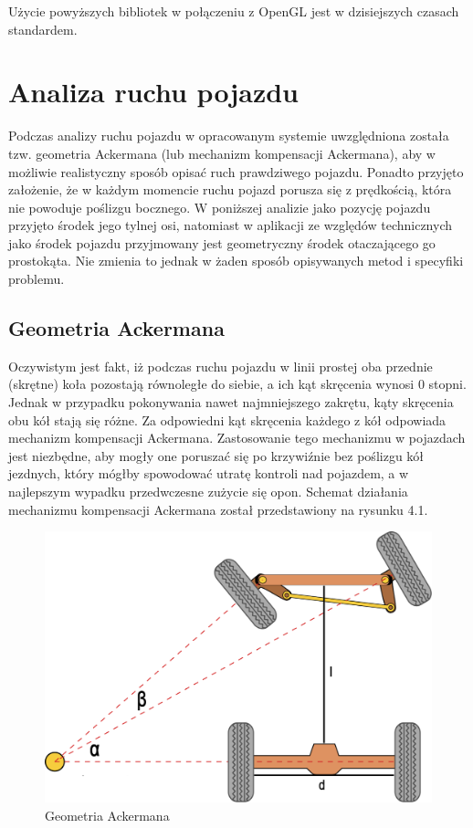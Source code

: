 \documentclass[a4paper,11pt,twoside]{report}
\theoremstyle{definition}
\begin{document}
Użycie powyższych bibliotek w połączeniu z OpenGL jest w dzisiejszych czasach standardem.

\chapter{Analiza ruchu pojazdu}

Podczas analizy ruchu pojazdu w opracowanym systemie uwzględniona została tzw. geometria Ackermana (lub mechanizm kompensacji Ackermana), aby w możliwie realistyczny sposób opisać ruch prawdziwego pojazdu. Ponadto przyjęto założenie, że w każdym momencie ruchu pojazd porusza się z prędkością, która nie powoduje poślizgu bocznego. W poniższej analizie jako pozycję pojazdu przyjęto środek jego tylnej osi, natomiast w aplikacji ze względów technicznych jako środek pojazdu przyjmowany jest geometryczny środek otaczającego go prostokąta. Nie zmienia to jednak w żaden sposób opisywanych metod i specyfiki problemu.

\section{Geometria Ackermana}

Oczywistym jest fakt, iż podczas ruchu pojazdu w linii prostej oba przednie (skrętne) koła pozostają równoległe do siebie, a ich kąt skręcenia wynosi 0 stopni. Jednak w przypadku pokonywania nawet najmniejszego zakrętu, kąty skręcenia obu kół stają się różne. Za odpowiedni kąt skręcenia każdego z kół odpowiada mechanizm kompensacji Ackermana. Zastosowanie tego mechanizmu w pojazdach jest niezbędne, aby mogły one poruszać się po krzywiźnie bez poślizgu kół jezdnych, który mógłby spowodować utratę kontroli nad pojazdem, a w najlepszym wypadku przedwczesne zużycie się opon. Schemat działania mechanizmu kompensacji Ackermana został przedstawiony na rysunku 4.1.

\begin{figure}[h!]
\centering
\includegraphics[scale=0.2]{ackermanGeometry}
\caption[Geometria Ackermana]{Geometria Ackermana}
\end{figure}
\end{document}
